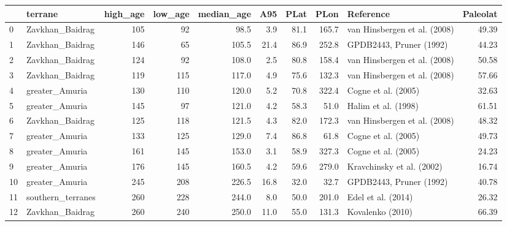 \documentclass[11pt]{article}
\begin{document}
    \begin{sidewaystable}
    {\tiny\begin{tabular}{llrrrrrrlr}
\toprule
{} &            terrane &  high\_age &  low\_age &  median\_age &   A95 &  PLat &   PLon &                               Reference &  Paleolat \\
\midrule
0  &    Zavkhan\_Baidrag &       105 &       92 &        98.5 &   3.9 &  81.1 &  165.7 &            van Hinsbergen et al. (2008) &     49.39 \\
1  &    Zavkhan\_Baidrag &       146 &       65 &       105.5 &  21.4 &  86.9 &  252.8 &                 GPDB2443, Pruner (1992) &     44.23 \\
2  &    Zavkhan\_Baidrag &       124 &       92 &       108.0 &   2.5 &  80.8 &  158.4 &            van Hinsbergen et al. (2008) &     50.58 \\
3  &    Zavkhan\_Baidrag &       119 &      115 &       117.0 &   4.9 &  75.6 &  132.3 &            van Hinsbergen et al. (2008) &     57.66 \\
4  &     greater\_Amuria &       130 &      110 &       120.0 &   5.2 &  70.8 &  322.4 &                     Cogne et al. (2005) &     32.63 \\
5  &     greater\_Amuria &       145 &       97 &       121.0 &   4.2 &  58.3 &   51.0 &                     Halim et al. (1998) &     61.51 \\
6  &    Zavkhan\_Baidrag &       125 &      118 &       121.5 &   4.3 &  82.0 &  172.3 &            van Hinsbergen et al. (2008) &     48.32 \\
7  &     greater\_Amuria &       133 &      125 &       129.0 &   7.4 &  86.8 &   61.8 &                     Cogne et al. (2005) &     49.73 \\
8  &     greater\_Amuria &       161 &      145 &       153.0 &   3.1 &  58.9 &  327.3 &                     Cogne et al. (2005) &     24.23 \\
9  &     greater\_Amuria &       176 &      145 &       160.5 &   4.2 &  59.6 &  279.0 &               Kravchinsky et al. (2002) &     16.74 \\
10 &     greater\_Amuria &       245 &      208 &       226.5 &  16.8 &  32.0 &   32.7 &                 GPDB2443, Pruner (1992) &     40.78 \\
11 &  southern\_terranes &       260 &      228 &       244.0 &   8.0 &  50.0 &  201.0 &                      Edel et al. (2014) &     26.32 \\
12 &    Zavkhan\_Baidrag &       260 &      240 &       250.0 &  11.0 &  55.0 &  131.3 &                        Kovalenko (2010) &     66.39 \\

\end{tabular}}
\end{sidewaystable}
\end{document}
